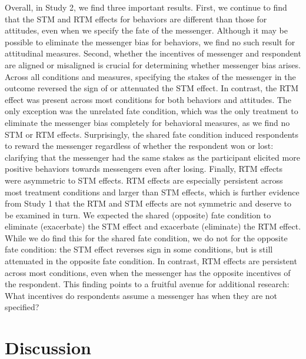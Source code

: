 Overall, in Study 2, we find three important results. First, we continue
to find that the STM and RTM effects for behaviors are different than
those for attitudes, even when we specify the fate of the messenger.
Although it may be possible to eliminate the messenger bias for
behaviors, we find no such result for attitudinal measures. Second,
whether the incentives of messenger and respondent are aligned or
misaligned is crucial for determining whether messenger bias arises.
Across all conditions and measures, specifying the stakes of the
messenger in the outcome reversed the sign of or attenuated the STM
effect. In contrast, the RTM effect was present across most conditions
for both behaviors and attitudes. The only exception was the unrelated
fate condition, which was the only treatment to eliminate the messenger
bias completely
for behavioral measures, as we find no STM or RTM effects. Surprisingly,
the shared fate condition induced respondents to reward the messenger regardless of whether
the respondent won or lost: clarifying that the messenger had the same
stakes as the participant elicited more positive behaviors towards
messengers even after losing. Finally, RTM effects were asymmetric to
STM effects. RTM effects are especially persistent across most treatment
conditions and larger than STM effects, which is further evidence from
Study 1 that the RTM and STM effects are not symmetric and deserve to
be examined in turn. We expected the shared (opposite) fate condition to
eliminate (exacerbate) the STM effect and exacerbate (eliminate) the RTM
effect. While we do find this for the shared fate condition, we do not for the opposite fate condition: the STM effect reverses sign in some
conditions, but is still attenuated in the opposite fate condition. In contrast, RTM
effects are persistent across most conditions, even when the messenger has the
opposite incentives of the respondent. This finding points to a fruitful avenue for additional research: What incentives do respondents assume a messenger has when they are not specified?

\section{Discussion}

